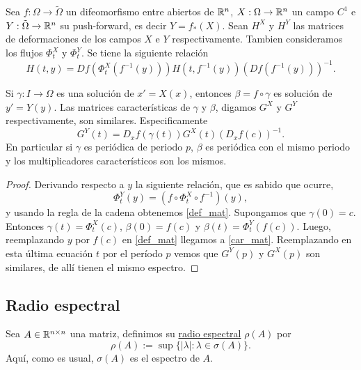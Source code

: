  
 

 \begin{teorema}{}



Sea $f:\Omega\to\tilde{\Omega}$ un difeomorfismo entre abiertos de $\mathbb{R}^n$, $X:\Omega\to\mathbb{R}^n$ un campo $C^1$ e $Y:\tilde{\Omega}\to\mathbb{R}^n$ su push-forward, es decir $Y=f_*(X)$.
Sean $H^X$ y $H^Y$ las matrices de deformaciones de los campos $X$ e $Y$ respectivamente. Tambien consideramos los flujos $\Phi_t^X$ y $\Phi_t^Y$. Se tiene la siguiente 
relación
\begin{equation}\label{def_mat}H(t,y)=Df(\Phi^X_t(f^{-1}(y)))H(t,f^{-1}(y)) \left(Df(f^{-1}(y))\right)^{-1}.\end{equation}


Si $\gamma:I\to\Omega$ es una solución de $x'=X(x)$, entonces $\beta=f\circ\gamma$ es solución de $y'=Y(y)$. Las matrices características 
de $\gamma$ y $\beta$, digamos  $G^X$ y $G^Y$ respectivamente, son similares. Especificamente
\begin{equation}\label{car_mat}G^Y(t)=D_xf(\gamma(t))G^X(t)\left(D_xf(c)\right)^{-1}.\end{equation}
En particular si $\gamma$ es periódica de periodo $p$, $\beta$ es periódica con el mismo periodo y los multiplicadores característicos son los mismos.

 \end{teorema}


 
\begin{proof}
 Derivando respecto a $y$ la siguiente relación, que es sabido que ocurre,
\[\Phi_t^Y(y)=(f\circ \Phi^X_t\circ f^{-1})(y),\]
y usando la regla de la cadena obtenemos \eqref{def_mat}. Supongamos que $\gamma(0)=c$. Entonces $\gamma(t)=\Phi^X_t(c)$, $\beta(0)=f(c)$ y $\beta(t)=\Phi_t^Y(f(c))$. 
Luego, reemplazando $y$ por $f(c)$ en \eqref{def_mat} llegamos a  \eqref{car_mat}.  Reemplazando en esta última ecuación $t$ por el período $p$ vemos que $G^Y(p)$ y $G^X(p)$
son similares, de allí tienen el mismo espectro.\end{proof}
 
 
 \subsection{Radio espectral}

\begin{definicion}{} Sea $A\in\mathbb{R}^{n\times n}$ una matriz, definimos su
\href{http://es.wikipedia.org/wiki/Radio_espectral}{radio espectral} $\rho(A)$ por
\[
\rho(A):= \sup\{|\lambda|: \lambda\in\sigma(A)\}.
\]
Aquí, como es usual, $\sigma(A)$ es el espectro de $A$.

 \end{definicion}




